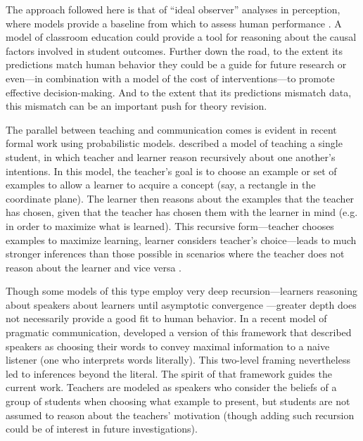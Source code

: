 \documentclass[10pt,letterpaper]{article}
\begin{document}
The approach followed here is that of ``ideal observer'' analyses in perception, where models provide a baseline from which to assess human performance \cite{geisler2003,frank2013}. A model of classroom education could provide a tool for reasoning about the causal factors involved in student outcomes. Further down the road, to the extent its predictions match human behavior they could be a guide for future research or even---in combination with a model of the cost of interventions---to promote effective decision-making. And to the extent that its predictions mismatch data, this mismatch can be an important push for theory revision.

The parallel between teaching and communication comes is evident in recent formal work using probabilistic models.  described a model of teaching a single student, in which teacher and learner reason recursively about one another's intentions. In this model, the teacher's goal is to choose an example or set of examples to allow a learner to acquire a concept (say, a rectangle in the coordinate plane). The learner then reasons about the examples that the teacher has chosen, given that the teacher has chosen them with the learner in mind (e.g. in order to maximize what is learned). This recursive form---teacher chooses examples to maximize learning, learner considers teacher's choice---leads to much stronger inferences than those possible in scenarios where the teacher does not reason about the learner and vice versa \cite{shafto2012}.

Though some models of this type employ very deep recursion---learners reasoning about speakers about learners until asymptotic convergence \cite{jager2010}---greater depth does not necessarily provide a good fit to human behavior. In a recent model of pragmatic communication,  developed a version of this framework that described speakers as choosing their words to convey maximal information to a naive listener (one who interprets words literally). This two-level framing nevertheless led to inferences beyond the literal. The spirit of that framework guides the current work. Teachers are modeled as speakers who consider the beliefs of a group of students when choosing what example to present, but students are not assumed to reason about the teachers' motivation (though adding such recursion could be of interest in future investigations). 
\end{document}
